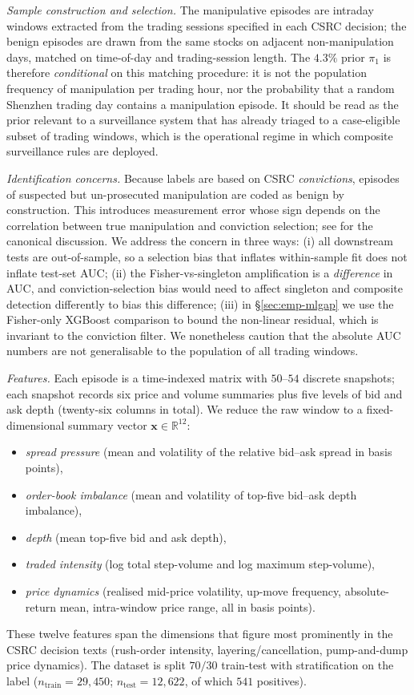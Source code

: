 \documentclass[11pt,a4paper]{article}
\theoremstyle{definition}
\theoremstyle{remark}
\newcommand{\R}{\mathbb{R}}
\newcommand{\1}{\mathbf{1}}
\newcommand{\x}{\mathbf{x}}
\begin{document}
\noindent\emph{Sample construction and selection.} The manipulative episodes are intraday windows extracted from the trading sessions specified in each CSRC decision; the benign episodes are drawn from the same stocks on adjacent non-manipulation days, matched on time-of-day and trading-session length. The $4.3\%$ prior $\pi_1$ is therefore \emph{conditional} on this matching procedure: it is not the population frequency of manipulation per trading hour, nor the probability that a random Shenzhen trading day contains a manipulation episode. It should be read as the prior relevant to a surveillance system that has already triaged to a case-eligible subset of trading windows, which is the operational regime in which composite surveillance rules are deployed.

\noindent\emph{Identification concerns.} Because labels are based on CSRC \emph{convictions}, episodes of suspected but un-prosecuted manipulation are coded as benign by construction. This introduces measurement error whose sign depends on the correlation between true manipulation and conviction selection; see \citet{comerton2014stock} for the canonical discussion. We address the concern in three ways: (i) all downstream tests are out-of-sample, so a selection bias that inflates within-sample fit does not inflate test-set AUC; (ii) the Fisher-vs-singleton amplification is a \emph{difference} in AUC, and conviction-selection bias would need to affect singleton and composite detection differently to bias this difference; (iii) in \S\ref{sec:emp-mlgap} we use the Fisher-only XGBoost comparison to bound the non-linear residual, which is invariant to the conviction filter. We nonetheless caution that the absolute AUC numbers are not generalisable to the population of all trading windows.

\noindent\emph{Features.} Each episode is a time-indexed matrix with $50$--$54$ discrete snapshots; each snapshot records six price and volume summaries plus five levels of bid and ask depth (twenty-six columns in total). We reduce the raw window to a fixed-dimensional summary vector $\x\in\R^{12}$:
\begin{itemize}
\item \emph{spread pressure} (mean and volatility of the relative bid--ask spread in basis points),
\item \emph{order-book imbalance} (mean and volatility of top-five bid--ask depth imbalance),
\item \emph{depth} (mean top-five bid and ask depth),
\item \emph{traded intensity} (log total step-volume and log maximum step-volume),
\item \emph{price dynamics} (realised mid-price volatility, up-move frequency, absolute-return mean, intra-window price range, all in basis points).
\end{itemize}
These twelve features span the dimensions that figure most prominently in the CSRC decision texts (rush-order intensity, layering/cancellation, pump-and-dump price dynamics). The dataset is split $70/30$ train-test with stratification on the label ($n_{\mathrm{train}}=29{,}450$; $n_{\mathrm{test}}=12{,}622$, of which $541$ positives).
\end{document}
